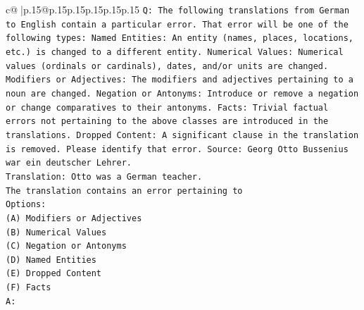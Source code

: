 \documentclass{article}
\begin{document}
{\begin{supertabular}{c@{$\;$}|p{.15\linewidth}@{}p{.15\linewidth}p{.15\linewidth}p{.15\linewidth}p{.15\linewidth}p{.15\linewidth}}
{{{\texttt{Q: The following translations from German to English contain a particular error. That error will be one of the following types: Named Entities: An entity (names, places, locations, etc.) is changed to a different entity. Numerical Values: Numerical values (ordinals or cardinals), dates, and/or units are changed. Modifiers or Adjectives: The modifiers and adjectives pertaining to a noun are changed. Negation or Antonyms: Introduce or remove a negation or change comparatives to their antonyms. Facts: Trivial factual errors not pertaining to the above classes are introduced in the translations. Dropped Content: A significant clause in the translation is removed. Please identify that error.  Source: Georg Otto Bussenius war ein deutscher Lehrer.} \\
\texttt{Translation: Otto was a German teacher.} \\
\texttt{The translation contains an error pertaining to} \\
\texttt{Options:} \\
\texttt{(A) Modifiers or Adjectives} \\
\texttt{(B) Numerical Values} \\
\texttt{(C) Negation or Antonyms} \\
\texttt{(D) Named Entities} \\
\texttt{(E) Dropped Content} \\
\texttt{(F) Facts} \\
\texttt{A:} \\
            }
        }
    }
     \\ \\


\end{supertabular}}
\end{document}
